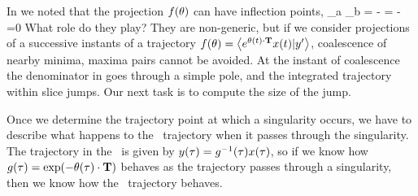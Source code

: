{In  we noted that the projection $f({\bf \theta})$
can have inflection points,
\beq
{}
     {\partial \gSpace_a \partial \gSpace_b}
    =
  - =
  - =0
What role do they play? They are non-generic, but
if we consider projections of a successive instants of a trajectory
$f({\bf \theta})=\left\langle {e^{\ensuremath{{\bf \theta}}(t) \cdot \ensuremath{\mathbf{T}}} \ensuremath{x}(t)}|{{y'}} \right\rangle$, coalescence of
nearby minima, maxima pairs cannot be avoided. At the instant of coalescence
the denominator in  goes through a simple pole,
and the integrated trajectory within slice jumps. Our next task is
to compute the size of the jump.

Once we determine the trajectory point at which
a singularity occurs, we have to describe what happens to the \reducedsp\ trajectory when it passes through the singularity. The trajectory in the \reducedsp\ is given by $y(\tau)=g^{-1}(\tau) x(\tau)$, so if we know how $g(\tau)=\exp({-{\bf \theta}(\tau) \cdot \mathbf{T}})$ behaves as the trajectory passes through a singularity, then we know how the \reducedsp\ trajectory behaves.





}
